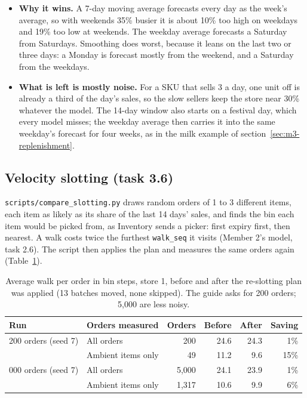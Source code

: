 \begin{itemize}
  \item \textbf{Why it wins.} A 7-day moving average forecasts every day as the week's average, so with weekends 35\%
    busier it is about 10\% too high on weekdays and 19\% too low at weekends. The weekday average forecasts a
    Saturday from Saturdays. Smoothing does worst, because it leans on the last two or three days: a Monday is
    forecast mostly from the weekend, and a Saturday from the weekdays.
  \item \textbf{What is left is mostly noise.} For a SKU that sells 3 a day, one unit off is already a third of the
    day's sales, so the slow sellers keep the store near 30\% whatever the model. The 14-day window also starts on a
    festival day, which every model misses; the weekday average then carries it into the same weekday's forecast for
    four weeks, as in the milk example of section~\ref{sec:m3-replenishment}.
\end{itemize}

\subsection{Velocity slotting (task 3.6)}

\texttt{scripts/compare\_slotting.py} draws random orders of 1 to 3 different items, each item as likely as its share
of the last 14 days' sales, and finds the bin each item would be picked from, as Inventory sends a picker: first expiry
first, then nearest. A walk costs twice the furthest \texttt{walk\_seq} it visits (Member 2's model, task 2.6). The
script then applies the plan and measures the same orders again (Table~\ref{tab:m3-slotting}).

\begin{table}[ht]
  \centering
  \footnotesize
  \begin{tabular}{@{}llrrrr@{}}
    \toprule
    Run & Orders measured & Orders & Before & After & Saving \\
    \midrule
    200 orders (seed 7)     & All orders         & 200     & 24.6 & 24.3 & 1\%  \\
                            & Ambient items only & 49      & 11.2 &  9.6 & 15\% \\
    \addlinespace[3pt]
    5{,}000 orders (seed 7) & All orders         & 5{,}000 & 24.1 & 23.9 & 1\%  \\
                            & Ambient items only & 1{,}317 & 10.6 &  9.9 & 6\%  \\
    \bottomrule
  \end{tabular}
  \caption{Average walk per order in bin steps, store 1, before and after the re-slotting plan was applied (13 batches
    moved, none skipped). The guide asks for 200 orders; 5,000 are less noisy.}
  \label{tab:m3-slotting}
\end{table}

